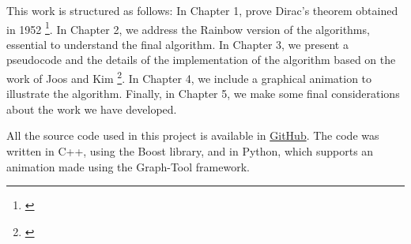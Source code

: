 This work is structured as follows: In Chapter 1, prove Dirac's theorem obtained in 1952 \footnote{\cite{dirac1952}}. In Chapter 2, we 
address the Rainbow version of the algorithms, essential to understand the final algorithm. In Chapter 3, 
we present a pseudocode and the details of the implementation of the algorithm based on the work of Joos and Kim \footnote{\cite{Joos_2020}}.
In Chapter 4, we include a graphical animation to illustrate the algorithm. 
Finally, in Chapter 5, we make some final considerations about the work we have developed.

All the source code used in this project is available in \href{https://github.com/wmrmrx/TCC}{GitHub}. The code was written in C++, using the Boost 
library, and in Python, which supports an animation made using the Graph-Tool framework.




